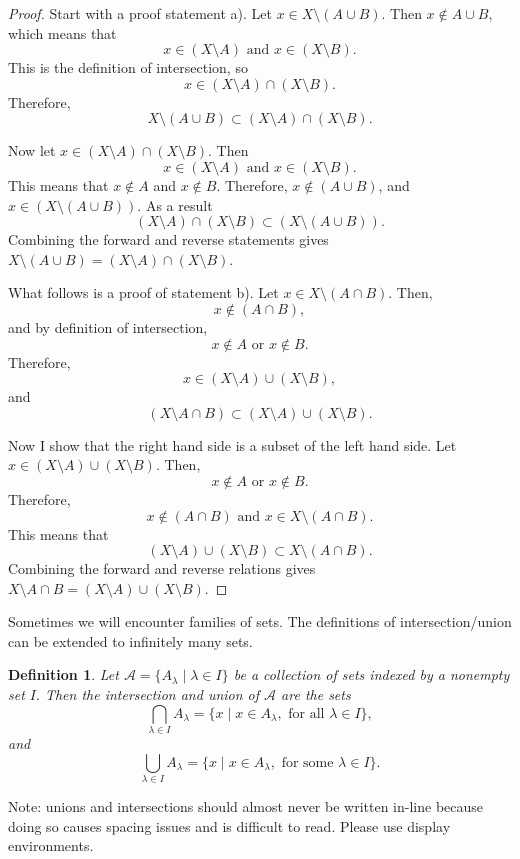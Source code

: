 \documentclass{amsart}
\newtheorem{definition}[theorem]{Definition}
\newcommand{\1}{\mathds{1}}
\numberwithin{equation}{section}
\numberwithin{theorem}{section}
\begin{document}
\begin{proof}
	Start with a proof statement a). Let $x\in X\setminus (A\cup B)$. Then $x\notin A\cup B$, which means that 
	\[x\in (X\setminus A) \text{ and } x\in (X\setminus B).\] This is the definition of intersection, so
	\[x\in (X\setminus A)\cap (X\setminus B).\] 
	Therefore,
	\[X\setminus (A\cup B)\subset (X\setminus A)\cap (X\setminus B).\]
	
	Now let $x\in (X\setminus A)\cap (X\setminus B)$. Then 
	\[x\in(X\setminus A) \text{ and } x\in (X\setminus B).\]
	This means that $x\notin A$ and $x\notin B$. Therefore, $x\notin (A\cup B)$, and $x\in (X\setminus (A\cup B))$.
	As a result $$(X\setminus A)\cap (X\setminus B)\subset (X\setminus (A\cup B)).$$ 
	Combining the forward and reverse statements gives $X\setminus (A\cup B)=(X\setminus A)\cap (X\setminus B)$.
	
	What follows is a proof of statement b). Let $x\in X\setminus (A\cap B)$. Then, $$x\notin (A\cap B),$$ and by definition of intersection, $$x\notin A \text{ or } x\notin B.$$ Therefore, $$x\in (X\setminus A)\cup (X\setminus B),$$ and $$(X\setminus A\cap B)\subset (X\setminus A)\cup (X\setminus B).$$ 
	
	Now I show that the right hand side is a subset of the left hand side. Let $x\in (X\setminus A)\cup (X\setminus B)$. Then, $$x\notin A \text{ or } x\notin B.$$ Therefore, $$x\notin (A\cap B)\text{ and } x\in X\setminus (A\cap B).$$ This means that $$(X\setminus A)\cup (X\setminus B)\subset X\setminus (A\cap B).$$ Combining the forward and reverse relations gives $X\setminus A\cap B = (X\setminus A)\cup (X\setminus B)$.
\end{proof}

Sometimes we will encounter families of sets. The definitions of intersection/union can be extended to infinitely many sets. 


\begin{definition}

 Let $\mathcal{A}=\{A_\lambda\mid \lambda\in I\}$ be a collection of sets indexed by a nonempty set $I.$ Then the intersection and union of $\mathcal{A}$ are the sets
$$\bigcap_{\lambda\in I} A_\lambda =\{x\mid x\in A_\lambda, \text{ for all } \lambda\in I\},$$
and
$$\bigcup_{\lambda\in I}A_\lambda =\{x\mid x\in A_\lambda, \text{ for some }\lambda\in I\}.$$
\end{definition}

Note: unions and intersections should almost never be written in-line because doing so causes spacing issues and is difficult to read.  Please use display environments.
\end{document}
